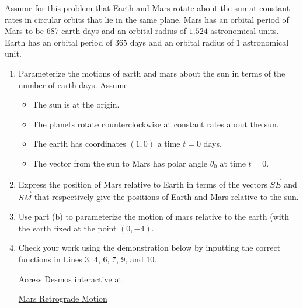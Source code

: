 \documentclass{ximera}
\begin{document}
\begin{exploration}  \label{Eddfsdfd6yhh}
Assume for this problem that Earth and Mars rotate about the sun at constant rates in circular orbits that lie in the same plane. Mars has an orbital period of Mars to be 687 earth days and an orbital radius of $1.524$ astronomical units. Earth has an orbital period of $365$ days and an orbital radius of $1$ astronomical unit.

\begin{enumerate}

\item Parameterize the motions of earth and mars about the sun in terms of the number of earth days. Assume

\begin{itemize}

\item{The sun is at the origin.}

\item{The planets rotate counterclockwise at constant rates about the sun.} 

\item{The earth has coordinates $(1,0)$ a time $t=0$ days.}

\item{The vector from the sun to Mars has polar angle $\theta_0$ at time $t=0$.}

\end{itemize}

\item Express the position of Mars relative to Earth in terms of the vectors $\overrightarrow{SE}$ and $\overrightarrow{SM}$
that respectively give the positions of Earth and Mars relative to the sun.


\item Use part (b)  to parameterize the motion of mars relative to the earth (with the earth  fixed at the point $(0,-4)$.


\item Check your work using the demonstration below by inputting the correct functions in Lines 3, 4, 6, 7, 9, and 10.

Access Desmos interactive at
 
\href{https://www.desmos.com/calculator/htc4xgrjxs}{Mars Retrograde Motion}

 
\begin{onlineOnly}
    \begin{center}
\end{center}
\end{onlineOnly}


\end{enumerate}
\end{exploration}
\end{document}
